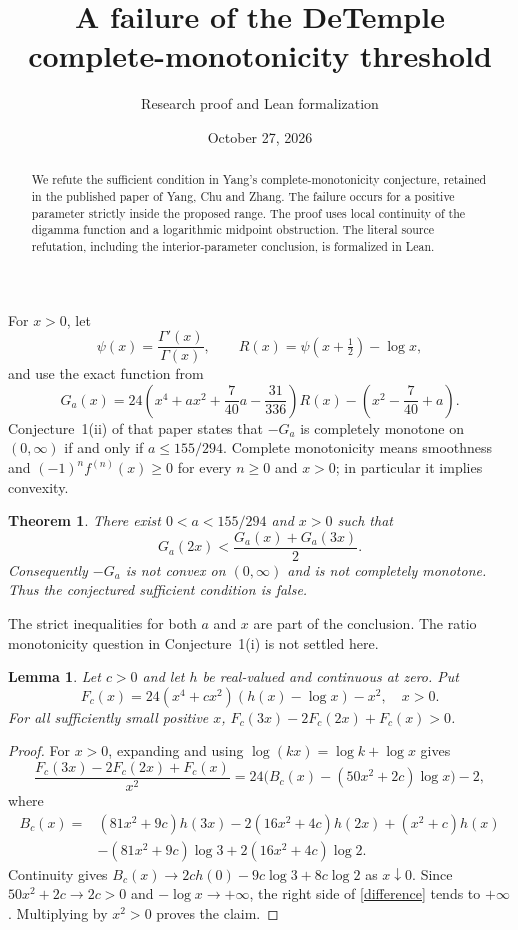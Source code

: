 \documentclass[11pt]{article}
\title{A failure of the DeTemple complete-monotonicity threshold}
\author{Research proof and Lean formalization}
\date{October 27, 2026}
\newtheorem{theorem}{Theorem}
\newtheorem{lemma}{Lemma}
\begin{document}
\maketitle
\begin{abstract}
We refute the sufficient condition in Yang's complete-monotonicity conjecture,
retained in the published paper of Yang, Chu and Zhang. The failure occurs for
a positive parameter strictly inside the proposed range. The proof uses local
continuity of the digamma function and a logarithmic midpoint obstruction.
The literal source refutation, including the interior-parameter conclusion, is
formalized in Lean.
\end{abstract}

For $x>0$, let
\[
 \psi(x)=\frac{\Gamma'(x)}{\Gamma(x)},\qquad
 R(x)=\psi(x+\tfrac12)-\log x,
\]
and use the exact function from \cite[eq.~(3.3)]{Yang}
\[
 G_a(x)=24\left(x^4+ax^2+\frac7{40}a-\frac{31}{336}\right)R(x)
          -\left(x^2-\frac7{40}+a\right).
\]
Conjecture~1(ii) of that paper states that $-G_a$ is completely monotone on
$(0,\infty)$ if and only if $a\le155/294$. Complete monotonicity means smoothness
and $(-1)^nf^{(n)}(x)\ge0$ for every $n\ge0$ and $x>0$; in particular it implies
convexity.

\begin{theorem}\label{counter}
There exist $0<a<155/294$ and $x>0$ such that
\[
 G_a(2x)<\frac{G_a(x)+G_a(3x)}2.
\]
Consequently $-G_a$ is not convex on $(0,\infty)$ and is not completely monotone.
Thus the conjectured sufficient condition is false.
\end{theorem}

The strict inequalities for both $a$ and $x$ are part of the conclusion. The ratio
monotonicity question in Conjecture~1(i) is not settled here.

\begin{lemma}\label{local}
Let $c>0$ and let $h$ be real-valued and continuous at zero. Put
\[
 F_c(x)=24(x^4+cx^2)(h(x)-\log x)-x^2,\quad x>0.
\]
For all sufficiently small positive $x$,
$F_c(3x)-2F_c(2x)+F_c(x)>0$.
\end{lemma}
\begin{proof}
For $x>0$, expanding and using $\log(kx)=\log k+\log x$ gives
\begin{equation}\label{difference}
 \frac{F_c(3x)-2F_c(2x)+F_c(x)}{x^2}
 =24\bigl(B_c(x)-(50x^2+2c)\log x\bigr)-2,
\end{equation}
where
\begin{align*}
 B_c(x)={}&(81x^2+9c)h(3x)-2(16x^2+4c)h(2x)+(x^2+c)h(x)\\
          &-(81x^2+9c)\log3+2(16x^2+4c)\log2.
\end{align*}
Continuity gives
$B_c(x)\to2ch(0)-9c\log3+8c\log2$ as $x\downarrow0$.
Since $50x^2+2c\to2c>0$ and $-\log x\to+\infty$, the right side of
\eqref{difference} tends to $+\infty$. Multiplying by $x^2>0$ proves the claim.
\end{proof}
\end{document}
